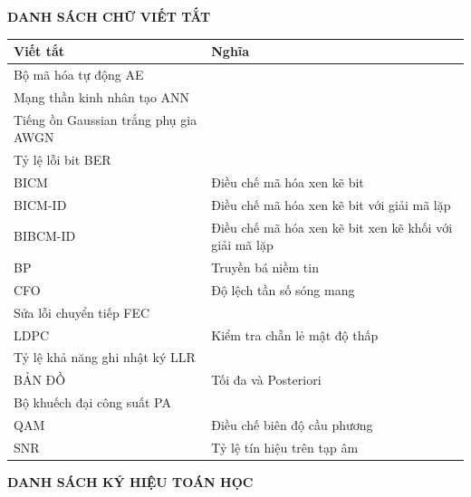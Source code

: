 \documentclass[a4paper,14pt]{extreport}
\begin{document}
\newpage
{}
\begin{center}
  {\bfseries DANH SÁCH CHỮ VIẾT TẮT}
\end{center}

\begin{longtable}{>{\raggedright\arraybackslash}p{3cm}>{\raggedright\arraybackslash}p{11cm}}
\toprule
\textbf{Viết tắt} & \textbf{Nghĩa}\\
\midrule
Bộ mã hóa tự động AE &\\
Mạng thần kinh nhân tạo ANN &\\
Tiếng ồn Gaussian trắng phụ gia AWGN &\\
Tỷ lệ lỗi bit BER &\\
BICM & Điều chế mã hóa xen kẽ bit\\
BICM-ID & Điều chế mã hóa xen kẽ bit với giải mã lặp\\
BIBCM-ID & Điều chế mã hóa xen kẽ bit xen kẽ khối với giải mã lặp\\
BP & Truyền bá niềm tin\\
CFO & Độ lệch tần số sóng mang\\
Sửa lỗi chuyển tiếp FEC &\\
LDPC & Kiểm tra chẵn lẻ mật độ thấp\\
Tỷ lệ khả năng ghi nhật ký LLR &\\
BẢN ĐỒ & Tối đa và Posteriori\\
Bộ khuếch đại công suất PA &\\
QAM & Điều chế biên độ cầu phương\\
SNR & Tỷ lệ tín hiệu trên tạp âm\\
\bottomrule
\end{longtable}

\newpage
{}
\begin{center}
  {\bfseries DANH SÁCH KÝ HIỆU TOÁN HỌC}
\end{center}
\end{document}
